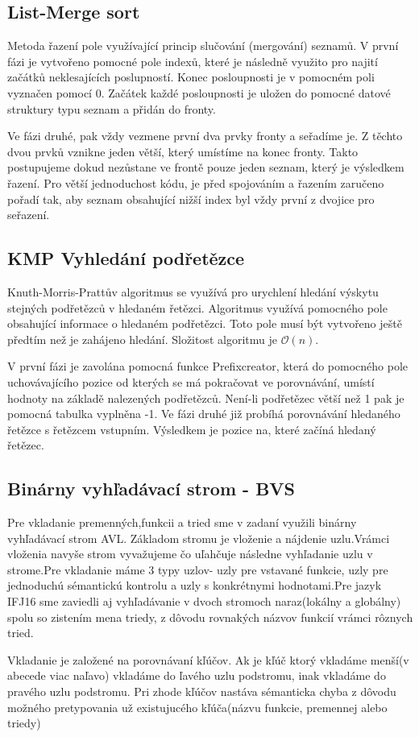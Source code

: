 \documentclass[12pt,a4paper]{report}
\begin{document}
\subsection{List-Merge sort}
\par Metoda řazení pole využívající princip slučování (mergování) seznamů.
V první fázi je vytvořeno pomocné pole indexů, které je následně využito pro najití začátků neklesajících poslupností. Konec posloupnosti je v pomocném poli vyznačen pomocí 0. Začátek každé posloupnosti je uložen do pomocné datové struktury typu seznam a přidán do fronty.
\par Ve fázi druhé, pak vždy vezmene první dva prvky fronty a seřadíme je. Z těchto dvou prvků vznikne jeden větší, který umístíme na konec fronty. Takto postupujeme dokud nezůstane ve frontě pouze jeden seznam, který je výsledkem řazení. Pro větší jednoduchost kódu, je před spojováním a řazením zaručeno pořadí tak, aby seznam obsahující nižší index byl vždy první z dvojice pro seřazení.

\subsection{KMP Vyhledání podřetězce}
\par Knuth-Morris-Prattův algoritmus se využívá pro urychlení hledání výskytu stejných podřetězců v hledaném řetězci. Algoritmus využívá pomocného pole obsahující informace o hledaném podřetězci. Toto pole musí být vytvořeno ještě předtím než je zahájeno hledání. Složitost algoritmu je $\mathcal{O}(n)$.
\par V první fázi je zavolána pomocná funkce Prefixcreator, která do pomocného pole uchovávajícího pozice od kterých se má pokračovat ve porovnávání, umístí hodnoty na základě nalezených podřetězců. Není-li podřetězec větší než 1 pak je pomocná tabulka vyplněna -1.
Ve fázi druhé již probíhá porovnávání hledaného řetězce s řetězcem vstupním. Výsledkem je pozice na, které začíná hledaný řetězec.


\subsection{Binárny vyhľadávací strom - BVS}
\par Pre vkladanie premenných,funkcii a tried sme v zadaní využili binárny vyhľadávací strom AVL. Základom stromu je vloženie a nájdenie uzlu.Vrámci vloženia navyše strom vyvažujeme čo uľahčuje následne vyhľadanie uzlu v strome.Pre vkladanie máme 3 typy uzlov- uzly pre vstavané funkcie, uzly pre jednoduchú sémantickú kontrolu a uzly s konkrétnymi hodnotami.Pre jazyk IFJ16 sme zaviedli aj vyhľadávanie v dvoch stromoch naraz(lokálny a globálny) spolu so zistením mena triedy, z dôvodu rovnakých názvov funkcií vrámci rôznych tried.
\par Vkladanie je založené na porovnávaní kľúčov. Ak je kľúč ktorý vkladáme menší(v abecede viac naľavo) vkladáme do ľavého uzlu podstromu, inak vkladáme do pravého uzlu podstromu. Pri zhode kľúčov nastáva sémanticka chyba z dôvodu možného pretypovania už existujucého kľúča(názvu funkcie, premennej alebo triedy)
\end{document}
